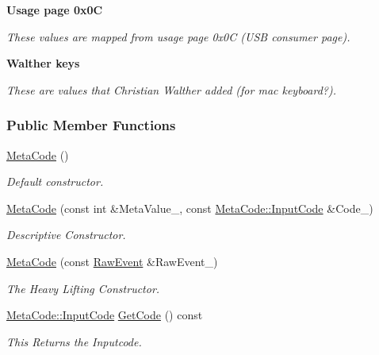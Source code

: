 \begin{Indent}{\bf Usage page 0x0C}\par
{\em These values are mapped from usage page 0x0C (USB consumer page). }\end{Indent}
\begin{Indent}{\bf Walther keys}\par
{\em These are values that Christian Walther added (for mac keyboard?). }\end{Indent}
\subsubsection*{Public Member Functions}
\begin{DoxyCompactItemize}
\item 
\hyperlink{classMezzanine_1_1MetaCode_a94dca88ec5dd3fc0c9c860bfa875a983}{MetaCode} ()
\begin{DoxyCompactList}\small\item\em Default constructor. \item\end{DoxyCompactList}\item 
\hyperlink{classMezzanine_1_1MetaCode_a2d32eb008845b54c70b510450259404f}{MetaCode} (const int \&MetaValue\_\-, const \hyperlink{classMezzanine_1_1MetaCode_a3b5633f0145bf3287cf53a3f05b5563c}{MetaCode::InputCode} \&Code\_\-)
\begin{DoxyCompactList}\small\item\em Descriptive Constructor. \item\end{DoxyCompactList}\item 
\hyperlink{classMezzanine_1_1MetaCode_abe2e7fa16bab17df5b1794c26bf191be}{MetaCode} (const \hyperlink{namespaceMezzanine_ae8d4c0ab783af89a250b0225b75753e5}{RawEvent} \&RawEvent\_\-)
\begin{DoxyCompactList}\small\item\em The Heavy Lifting Constructor. \item\end{DoxyCompactList}\item 
\hyperlink{classMezzanine_1_1MetaCode_a3b5633f0145bf3287cf53a3f05b5563c}{MetaCode::InputCode} \hyperlink{classMezzanine_1_1MetaCode_a83484f23e49db65d343d2ea75c9af66c}{GetCode} () const 
\begin{DoxyCompactList}\small\item\em This Returns the Inputcode. \item\end{DoxyCompactList}\item 

\end{DoxyCompactItemize}
